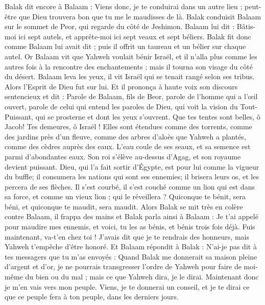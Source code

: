 \begin{multicols}{2}
Balak dit encore à Balaam : Viens donc, je te conduirai dans un autre lieu ; peut-être que Dieu trouvera bon que tu me le maudisses de là.
Balak conduisit Balaam sur le sommet de Peor, qui regarde du côté de Jeshimon.
Balaam lui dit : Bâtis-moi ici sept autels, et apprête-moi ici sept veaux et sept béliers.
Balak fit donc comme Balaam lui avait dit ; puis il offrit un taureau et un bélier sur chaque autel.
\VerseOne{}Or Balaam vit que Yahweh voulait bénir Israël, et il n'alla plus comme les autres fois à la rencontre des enchantements ; mais il tourna son visage du côté du désert.
Balaam leva les yeux, il vit Israël qui se tenait rangé selon ses tribus. Alors l'Esprit de Dieu fut sur lui.
Et il prononça à haute voix son discours sentencieux et dit : Parole de Balaam, fils de Beor, parole de l'homme qui a l'œil ouvert,
parole de celui qui entend les paroles de Dieu, qui voit la vision du Tout-Puissant, qui se prosterne et dont les yeux s'ouvrent.
Que tes tentes sont belles, ô Jacob! Tes demeures, ô Israël !
Elles sont étendues comme des torrents, comme des jardins près d'un fleuve, comme des arbres d'aloès que Yahweh a plantés, comme des cèdres auprès des eaux.
L'eau coule de ses seaux, et sa semence est parmi d'abondantes eaux. Son roi s'élève au-dessus d'Agag, et son royaume devient puissant.
Dieu, qui l'a fait sortir d'Égypte, est pour lui comme la vigueur du buffle; il consumera les nations qui sont ses ennemies; il brisera leurs os, et les percera de ses flèches.
Il s'est courbé, il s'est couché comme un lion qui est dans sa force, et comme un vieux lion ; qui le réveillera ? Quiconque te bénit, sera béni, et quiconque te maudit, sera maudit.
Alors Balak se mit très en colère contre Balaam, il frappa des mains et Balak parla ainsi à Balaam : Je t’ai appelé pour maudire mes ennemis, et voici, tu les as bénis, et bénis trois fois déjà.
Fuis maintenant, va-t'en chez toi ! J'avais dit que je te rendrais des honneurs, mais Yahweh t'empêche d’être honoré.
Et Balaam répondit à Balak : N'ai-je pas dit à tes messagers que tu m'as envoyés :
Quand Balak me donnerait sa maison pleine d'argent et d'or, je ne pourrais transgresser l'ordre de Yahweh pour faire de moi-même du bien ou du mal ; mais ce que Yahweh dira, je le dirai.
Maintenant donc je m'en vais vers mon peuple. Viens, je te donnerai un conseil, et je te dirai ce que ce peuple fera à ton peuple, dans les derniers jours.

\end{multicols}
